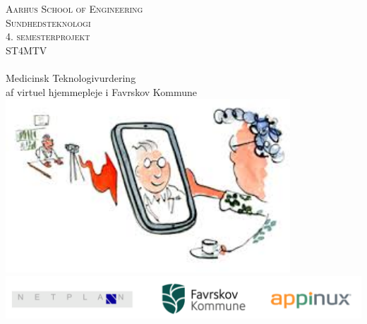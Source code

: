 \begin{titlingpage}
\begin{center}


\textsc{\LARGE Aarhus School of Engineering}\\[1cm]

\textsc{\Large Sundhedsteknologi}\\
\textsc{\Large 4. semesterprojekt}\\
\textsc{\Large ST4MTV}\\[0.5cm]

\noindent\makebox[\linewidth]{\rule{\textwidth}{0.4pt}}\\
[0.5cm]{\Huge Medicinsk Teknologivurdering}\\
{af virtuel hjemmepleje i Favrskov Kommune}
\noindent\makebox[\linewidth]{\rule{\textwidth}{0.4pt}}\\[1cm]

\includegraphics[width=0.8\textwidth]{Figurer/forside}\\
\includegraphics[width=1\textwidth]{Figurer/Snip20160407_38}\\[1.5cm]



\end{center}



\end{titlingpage}
